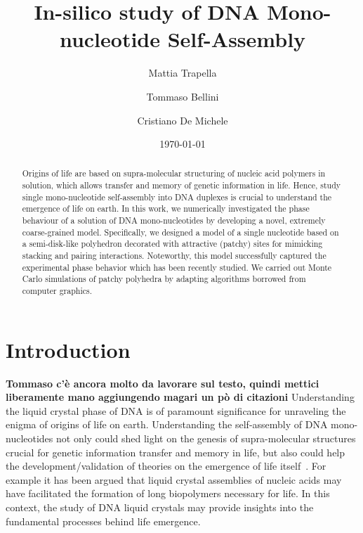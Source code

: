 \documentclass[aip,jcp, amsmath, amssymb, reprint]{revtex4-1}
\begin{document}
\title{In-silico study of DNA Mono-nucleotide Self-Assembly}
\date{\today}

\author{Mattia Trapella}

\author{Tommaso Bellini}
\author{Cristiano De Michele}

\begin{abstract}
  Origins of life are based on supra-molecular structuring
  of nucleic acid polymers in solution, which allows transfer and memory of genetic information in life. 
  Hence, study single mono-nucleotide self-assembly into DNA duplexes is crucial to understand 
  the emergence of life on earth.
  In this work, we numerically investigated the phase behaviour of a solution of DNA
  mono-nucleotides by developing a novel, extremely coarse-grained model. Specifically, 
  we designed a model of a single nucleotide based on a semi-disk-like polyhedron decorated with attractive 
  (patchy) sites for mimicking stacking and pairing interactions. Noteworthy, 
  this model successfully captured the experimental phase behavior which has been recently studied.
  We carried out Monte Carlo simulations of patchy polyhedra by adapting algorithms borrowed 
  from computer graphics.
\end{abstract}

\maketitle


\section{Introduction}
{\bf\color{red} Tommaso c'è ancora molto da lavorare sul testo, quindi mettici liberamente mano aggiungendo 
magari un pò di citazioni}
Understanding the liquid crystal phase of DNA is of paramount significance for unraveling the enigma of origins of life
on earth. Understanding the self-assembly of DNA mono-nucleotides not only could shed light on the genesis of 
supra-molecular structures crucial for genetic information transfer and memory in life, but also could help the 
development/validation of theories on the emergence of life itself~\cite{Jia}. 
For example it has been argued that  liquid crystal assemblies of nucleic acids may have facilitated the formation 
of long biopolymers necessary for life. In this context, the study of DNA liquid crystals may provide 
insights into the fundamental processes behind life emergence.  \\
\end{document}

